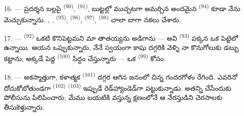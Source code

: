 16. --- ప్రదర్శన బల్లపై  \textsuperscript{(90)},
 \textsuperscript{(91)}, బుట్టల్లో ముచ్చటగా అమర్చిన అందమైన
 \textsuperscript{(94)} కూడా నేను మెచ్చుకున్నాను.
, , 
\textsuperscript{(95)},  \textsuperscript{(96)},
 \textsuperscript{(97)}, 
\textsuperscript{(98)} చాలా బాగా నకలు చేశారు.

\VUsaut{4.4mm}
\VUsaut{2.8mm}

17. ---  \textsuperscript{(92)} ఒకటి కొనిపెట్టమని మా తాతయ్యను
అడిగాను — అవి  \textsuperscript{(93)} పక్కన ఒక పెట్టెలో ఉన్నాయి.
ఆయన ఒప్పుకున్నారు, నేనే స్వయంగా కాషు దగ్గరికి వెళ్ళి నా కొనుగోలుకు డబ్బు కట్టాను; అక్కడే
పెద్ద  \textsuperscript{(100)} సిద్ధం చేస్తున్నారు — ఒక
 \textsuperscript{(99)} కోసం.

18. --- అకస్మాత్తుగా, కళాత్మక  \textsuperscript{(101)} దగ్గర ఆగిన
జనంలో చిన్న గందరగోళం రేగింది. ఎవరినో దోచుకోబోతుండగా 
\textsuperscript{(102)}  \textsuperscript{(103)} ఇప్పుడే
రెడ్‌హ్యాండెడ్‌గా పట్టుకున్నాడు. అతన్ని  చేసేందుకు పోలీసును
పిలిపించారు; మేము బయటికి వస్తున్న క్షణంలోనే ఆ నేరస్తుడిని చెరసాలకు తీసుకెళ్తున్నారు.

\VUsaut{6.0mm}
\VUfilet{22mm}
